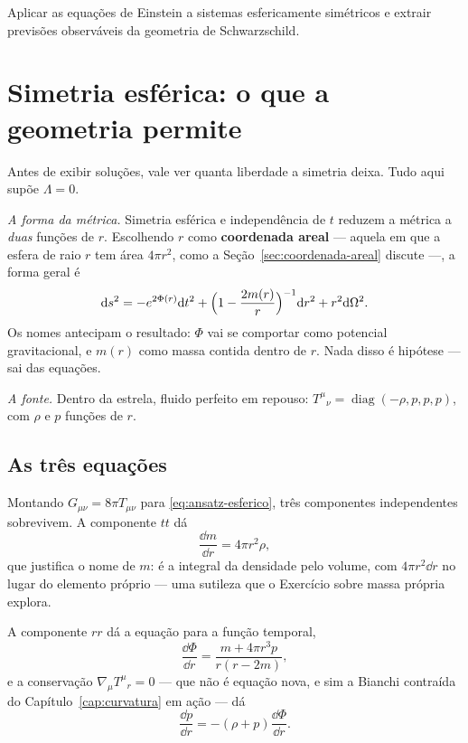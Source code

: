 \documentclass[12pt,a4paper,oneside]{book}
\theoremstyle{rgplain}
\theoremstyle{rgremark}
\begin{document}
\begin{objetivos}
Aplicar as equações de Einstein a sistemas esfericamente simétricos e extrair
previsões observáveis da geometria de Schwarzschild.
\end{objetivos}

\section{Simetria esférica: o que a geometria permite}
\label{sec:ansatz-esferico}

Antes de exibir soluções, vale ver quanta liberdade a simetria deixa. Tudo
aqui supõe $\Lambda=0$.

\emph{A forma da métrica.} Simetria esférica e independência de $t$ reduzem a
métrica a \emph{duas} funções de $r$. Escolhendo $r$ como \textbf{coordenada
areal} --- aquela em que a esfera de raio $r$ tem área $4\pi r^2$, como a
Seção~\ref{sec:coordenada-areal} discute ---, a forma geral é
\begin{equation}
  \mathrm{d} s^2=-e^{2\Phi(r)}\mathrm{d} t^2
  +\Bigl(1-\frac{2m(r)}{r}\Bigr)^{-1}\mathrm{d} r^2
  +r^2\mathrm{d}\Omega^2 .
  \label{eq:ansatz-esferico}
\end{equation}
Os nomes antecipam o resultado: $\Phi$ vai se comportar como potencial
gravitacional, e $m(r)$ como massa contida dentro de $r$. Nada disso é
hipótese --- sai das equações.

\emph{A fonte.} Dentro da estrela, fluido perfeito em repouso:
$T^{\mu}{}_{\nu}=\operatorname{diag}(-\rho,p,p,p)$, com $\rho$ e $p$ funções
de $r$.

\subsection*{As três equações}

Montando $G_{\mu\nu}=8\pi T_{\mu\nu}$ para \eqref{eq:ansatz-esferico}, três
componentes independentes sobrevivem. A componente $tt$ dá
\begin{equation}
  \frac{\dd m}{\dd r}=4\pi r^2\rho ,
  \label{eq:massa-acumulada}
\end{equation}
que justifica o nome de $m$: é a integral da densidade pelo volume, com
$4\pi r^2\dd r$ no lugar do elemento próprio --- uma sutileza que o
Exercício sobre massa própria explora.

A componente $rr$ dá a equação para a função temporal,
\begin{equation}
  \frac{\dd\Phi}{\dd r}=\frac{m+4\pi r^3p}{r(r-2m)} ,
  \label{eq:phi-linha}
\end{equation}
e a conservação $\nabla_\mu T^{\mu}{}_{r}=0$ --- que não é equação nova, e sim
a Bianchi contraída do Capítulo~\ref{cap:curvatura} em ação --- dá
\begin{equation}
  \frac{\dd p}{\dd r}=-(\rho+p)\frac{\dd\Phi}{\dd r} .
  \label{eq:euler-relativistico}
\end{equation}
\end{document}
